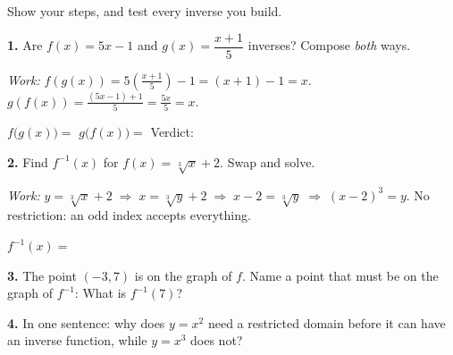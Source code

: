 \documentclass[10pt]{article}
\begin{document}
\begin{practicebox}
Show your steps, and test every inverse you build.

\vspace{4pt}
\textbf{1.} Are $f(x)=5x-1$ and $g(x)=\dfrac{x+1}{5}$ inverses? Compose \emph{both} ways.

{\small \emph{Work:} $f(g(x))=5\!\left(\frac{x+1}{5}\right)-1=(x+1)-1=x$. \;
$g(f(x))=\frac{(5x-1)+1}{5}=\frac{5x}{5}=x$.}

$f\big(g(x)\big)=$  \hspace{0.3in} $g\big(f(x)\big)=$  \hspace{0.3in}
Verdict: 

\vspace{6pt}
\textbf{2.} Find $f^{-1}(x)$ for $f(x)=\sqrt[3]{x}+2$. \; Swap and solve.

{\small \emph{Work:} $y=\sqrt[3]{x}+2 \;\Rightarrow\; x=\sqrt[3]{y}+2 \;\Rightarrow\;
x-2=\sqrt[3]{y} \;\Rightarrow\; (x-2)^{3}=y$. \; No restriction: an odd index accepts everything.}

$f^{-1}(x)=$ 

\vspace{6pt}
\textbf{3.} The point $(-3,7)$ is on the graph of $f$. Name a point that must be on the graph of
$f^{-1}$:  \; What is $f^{-1}(7)$? 

\vspace{6pt}
\textbf{4.} In one sentence: why does $y=x^{2}$ need a restricted domain before it can have an
inverse function, while $y=x^{3}$ does not? 
\end{practicebox}
\end{document}
